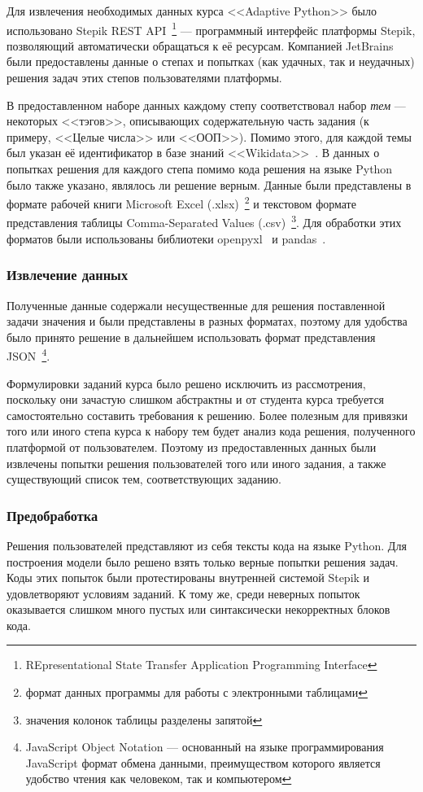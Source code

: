\documentclass[14pt]{matmex-diploma-custom}
\begin{document}
Для извлечения необходимых данных курса <<Adaptive Python>> было использовано Stepik REST API~\footnote{REpresentational State Transfer Application Programming Interface} --- программный интерфейс платформы Stepik, позволяющий автоматически обращаться к её ресурсам. Компанией JetBrains были предоставлены данные о степах и попытках (как удачных, так и неудачных) решения задач этих степов пользователями платформы.

В предоставленном наборе данных каждому степу соответствовал набор \textit{тем} --- некоторых <<тэгов>>, описывающих содержательную часть задания (к примеру, <<Целые числа>> или <<ООП>>). Помимо этого, для каждой темы был указан её идентификатор в базе знаний <<Wikidata>>~\cite{wikidata}. В данных о попытках решения для каждого степа помимо кода решения на языке Python было также указано, являлось ли решение верным. Данные были представлены в формате рабочей книги Microsoft Excel (.xlsx)~\footnote{формат данных программы для работы с электронными таблицами} и текстовом формате представления таблицы Comma-Separated Values (.csv)~\footnote{значения колонок таблицы разделены запятой}. Для обработки этих форматов были использованы библиотеки openpyxl~\cite{openpyxl} и pandas~\cite{pandas}.

\subsubsection{Извлечение данных}
Полученные данные содержали несущественные для решения поставленной задачи значения и были представлены в разных форматах, поэтому для удобства было принято решение в дальнейшем использовать формат представления JSON~\footnote{JavaScript Object Notation --- основанный на языке программирования JavaScript формат обмена данными, преимуществом которого является удобство чтения как человеком, так и компьютером}.

Формулировки заданий курса было решено исключить из рассмотрения, поскольку они зачастую слишком абстрактны и от студента курса требуется самостоятельно составить требования к решению. Более полезным для привязки того или иного степа курса к набору тем будет анализ кода решения, полученного платформой от пользователем. Поэтому из предоставленных данных были извлечены попытки решения пользователей того или иного задания, а также существующий список тем, соответствующих заданию.

\subsubsection{Предобработка}
Решения пользователей представляют из себя тексты кода на языке Python. Для построения модели было решено взять только верные попытки решения задач. Коды этих попыток были протестированы внутренней системой Stepik и удовлетворяют условиям заданий. К тому же, среди неверных попыток оказывается слишком много пустых или синтаксически некорректных блоков кода.
\end{document}

